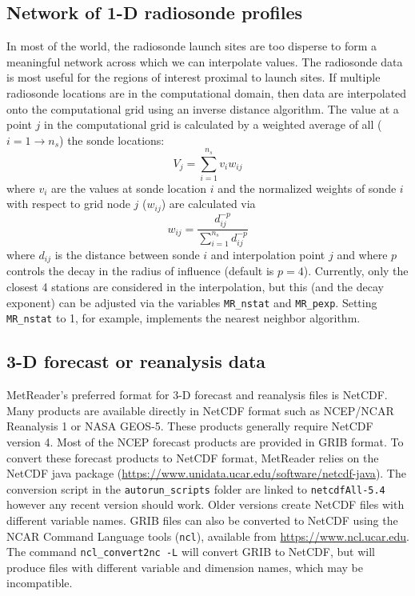\documentclass[11pt]{article}   %
\begin{document}
\subsection{Network of 1-D radiosonde profiles}
In most of the world, the radiosonde launch sites are too disperse to form
a meaningful network across which we can interpolate values.  The radiosonde
data is most useful for the regions of interest proximal to launch sites.
If multiple radiosonde locations are in the computational domain, then data
are interpolated onto the computational grid using an inverse distance
algorithm.  The value at a point $j$ in the computational grid is calculated
by a weighted average of all ($i=1\rightarrow n_s$) the sonde locations:
\begin{equation*}
V_j = \sum_{i=1}^{n_s} v_i w_{ij}
\end{equation*}
where $v_i$ are the values at sonde location $i$ and the normalized weights of
sonde $i$ with respect to grid node $j$ ($w_{ij}$) are calculated via
\begin{equation*}
w_{ij} = \frac{d_{ij}^{-p}}{\sum_{i=1}^{n_s} d_{ij}^{-p}}
\end{equation*}
where $d_{ij}$ is the distance between sonde $i$ and interpolation point $j$
and where $p$ controls
the decay in the radius of influence (default is $p=4$).  Currently, only the closest
4 stations are considered in the interpolation, but this (and the decay exponent) can
be adjusted via the variables \texttt{MR\_nstat} and \texttt{MR\_pexp}.  Setting
\texttt{MR\_nstat} to 1, for example, implements the nearest neighbor algorithm.

\subsection{3-D forecast or reanalysis data}
MetReader's preferred format for 3-D forecast and reanalysis files is NetCDF.  Many
products are available directly in NetCDF format such as NCEP/NCAR Reanalysis 1 or
NASA GEOS-5.  These products generally require NetCDF version 4.  Most of the NCEP
forecast products are provided in GRIB format.  To convert these forecast products
to NetCDF format, MetReader relies on the NetCDF java package
(\url{https://www.unidata.ucar.edu/software/netcdf-java}). The
conversion script in the \texttt{autorun\_scripts} folder are linked to \texttt{netcdfAll-5.4}
however any recent version should work.  Older versions create NetCDF files with
different variable names. GRIB files can also be converted to NetCDF using the NCAR Command
Language tools (\texttt{ncl}), available from \url{https://www.ncl.ucar.edu}.  The
command \texttt{ncl\_convert2nc -L} will convert GRIB to NetCDF, but will produce
files with different variable and dimension names, which may be incompatible.
\end{document}
